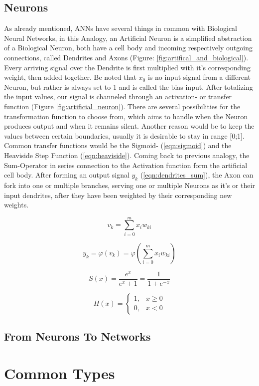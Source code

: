 \subsection{Neurons}
As already mentioned, ANNs have several things in common with Biological Neural Networks, in this Analogy, an Artificial Neuron is a simplified abstraction of a Biological Neuron, both have a cell body and incoming respectively outgoing connections, called Dendrites and Axons (Figure: \ref{fig:artifical_and_biological}). Every arriving signal over the Dendrite is first multiplied with it's corresponding weight, then added together. Be noted that $x_{0}$ is no input signal from a different Neuron, but rather is always set to 1 and is called the bias input. \newline
After totalizing the input values, our signal is channeled through an activation- or transfer function (Figure \ref{fig:artificial_neuron}). There are several possibilities for the transformation function to choose from, which aims to handle when the Neuron produces output and when it remains silent. Another reason would be to keep the values between certain boundaries, usually it is desirable to stay in range [0;1]. Common transfer functions would be the Sigmoid- (\ref{eqn:sigmoid}) and the Heaviside Step Function (\ref{eqn:heaviside}). Coming back to previous analogy, the Sum-Operator in series connection to the Activation function form the artificial cell body.\newline 
After forming an output signal $y_{k}$ (\ref{eqn:dendrites_sum}), the Axon can fork into one or multiple branches, serving one or multiple Neurons as it's or their input dendrites, after they have been weighted by their corresponding new weights.   


\begin{equation}
\label{eqn:vk}
	v_{k} = \sum_{i=0}^{m} x_{i} w_{ki}
\end{equation}  

\begin{equation}
	\label{eqn:dendrites_sum}
	y_{k} = \varphi(v_{k}) = \varphi(\sum_{i=0}^{m} x_{i} w_{ki}) 
\end{equation} 

\begin{equation}
	\label{eqn:sigmoid}
	S(x) = \frac{e^x}{e^x + 1} = \frac{1}{1 + e^{-x}}
\end{equation} 

\begin{equation}
	\label{eqn:heaviside}
	H(x)= 
	\begin{cases}
	1,& x\geq 0\\
	0,& x < 0
	\end{cases}
\end{equation}

\subsection{From Neurons To Networks}


\section{Common Types}
